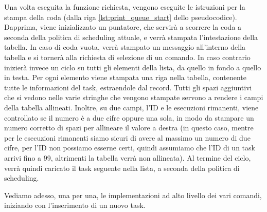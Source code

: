         Una volta eseguita la funzione richiesta, vengono eseguite le istruzioni per la stampa della coda (dalla riga \ref{lst:print_queue_start} dello pseudocodice). Dapprima, viene inizializzato un puntatore, che servirà a scorrere la coda a seconda della politica di scheduling attuale, e verrà stampata l'intestazione della tabella. In caso di coda vuota, verrà stampato un messaggio all'interno della tabella e si tornerà alla richiesta di selezione di un comando. In caso contrario inizierà invece un ciclo su tutti gli elementi della lista, da quello in fondo a quello in testa. Per ogni elemento viene stampata una riga nella tabella, contenente tutte le informazioni del task, estraendole dal record. Tutti gli spazi aggiuntivi che si vedono nelle varie stringhe che vengono stampate servono a rendere i campi della tabella allineati. Inoltre, su due campi, l'ID e le esecuzioni rimanenti, viene controllato se il numero è a due cifre oppure una sola, in modo da stampare un numero corretto di spazi per allineare il valore a destra (in questo caso, mentre per le esecuzioni rimanenti siamo sicuri di avere al massimo un numero di due cifre, per l'ID non possiamo esserne certi, quindi assumiamo che l'ID di un task arrivi fino a 99, altrimenti la tabella verrà non allineata). Al termine del ciclo, verrà quindi caricato il task seguente nella lista, a seconda della politica di scheduling.
        
        Vediamo adesso, una per una, le implementazioni ad alto livello dei vari comandi, iniziando con l'inserimento di un nuovo task.
        
